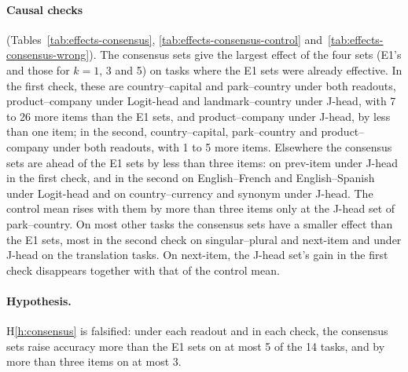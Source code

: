 \documentclass[11pt,a4paper]{article}
\begin{document}
\paragraph{Causal checks} (Tables~\ref{tab:effects-consensus}, \ref{tab:effects-consensus-control} and~\ref{tab:effects-consensus-wrong}). The consensus sets give the largest effect of the four sets (E1's and those for $k=1$, 3 and 5) on tasks where the E1 sets were already effective. In the first check, these are country--capital and park--country under both readouts, product--company under Logit-head and landmark--country under J-head, with 7 to 26 more items than the E1 sets, and product--company under J-head, by less than one item; in the second, country--capital, park--country and product--company under both readouts, with 1 to 5 more items. Elsewhere the consensus sets are ahead of the E1 sets by less than three items: on prev-item under J-head in the first check, and in the second on English--French and English--Spanish under Logit-head and on country--currency and synonym under J-head. The control mean rises with them by more than three items only at the J-head set of park--country. On most other tasks the consensus sets have a smaller effect than the E1 sets, most in the second check on singular--plural and next-item and under J-head on the translation tasks. On next-item, the J-head set's gain in the first check disappears together with that of the control mean.

\paragraph{Hypothesis.} H\ref{h:consensus} is falsified: under each readout and in each check, the consensus sets raise accuracy more than the E1 sets on at most 5 of the 14 tasks, and by more than three items on at most 3.

\begin{table}[H]
\centering\footnotesize\setlength{\tabcolsep}{3pt}

\caption{E1b: rule-style head sets under Logit-head (L) and J-head (J): from the most accurate instruction template (E1, Table~\ref{tab:heads-simple}), and the heads that meet Definition~\ref{def:lth} under at least $k$ of the five templates. Each cell: number of heads and, in brackets, its share of the model's 1,024 heads in \%. Distinct: heads in the set of at least one task. The set for $k=1$ contains the E1 set and the set for $k=5$ is contained in it; of the heads in the sets for $k=3$, summed over tasks, 198 of 227 (L) and 300 of 343 (J) are in the E1 sets.}
\label{tab:heads-consensus}
\end{table}
\end{document}
